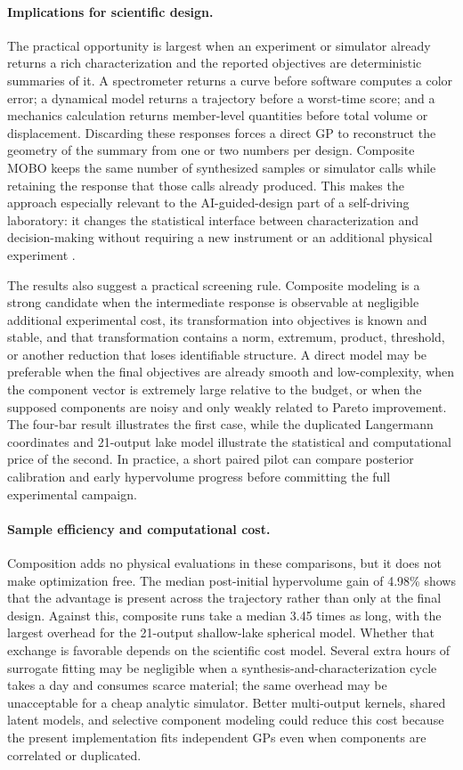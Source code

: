 \documentclass{article}
\begin{document}
\paragraph{Implications for scientific design.}
The practical opportunity is largest when an experiment or simulator already
returns a rich characterization and the reported objectives are deterministic
summaries of it.  A spectrometer returns a curve before software computes a
color error; a dynamical model returns a trajectory before a worst-time score;
and a mechanics calculation returns member-level quantities before total
volume or displacement.  Discarding these responses forces a direct GP to
reconstruct the geometry of the summary from one or two numbers per design.
Composite MOBO keeps the same number of synthesized samples or simulator calls
while retaining the response that those calls already produced.  This makes
the approach especially relevant to the AI-guided-design part of a
self-driving laboratory: it changes the statistical interface between
characterization and decision-making without requiring a new instrument or an
additional physical experiment
\cite{macleod2022selfdriving,gopakumar2018multiobjective}.

The results also suggest a practical screening rule.  Composite modeling is a
strong candidate when the intermediate response is observable at negligible
additional experimental cost, its transformation into objectives is known and
stable, and that transformation contains a norm, extremum, product, threshold,
or another reduction that loses identifiable structure.  A direct model may
be preferable when the final objectives are already smooth and low-complexity,
when the component vector is extremely large relative to the budget, or when
the supposed components are noisy and only weakly related to Pareto
improvement.  The four-bar result illustrates the first case, while the
duplicated Langermann coordinates and 21-output lake model illustrate the
statistical and computational price of the second.  In practice, a short
paired pilot can compare posterior calibration and early hypervolume progress
before committing the full experimental campaign.

\paragraph{Sample efficiency and computational cost.}
Composition adds no physical evaluations in these comparisons, but it does not
make optimization free.  The median post-initial hypervolume gain of 4.98\%
shows that the advantage is present across the trajectory rather than only at
the final design.  Against this, composite runs take a median 3.45 times as
long, with the largest overhead for the 21-output shallow-lake spherical
model.  Whether that exchange is favorable depends on the scientific cost
model.  Several extra hours of surrogate fitting may be negligible when a
synthesis-and-characterization cycle takes a day and consumes scarce material;
the same overhead may be unacceptable for a cheap analytic simulator.  Better
multi-output kernels, shared latent models, and selective component modeling
could reduce this cost because the present implementation fits independent GPs
even when components are correlated or duplicated.
\end{document}
